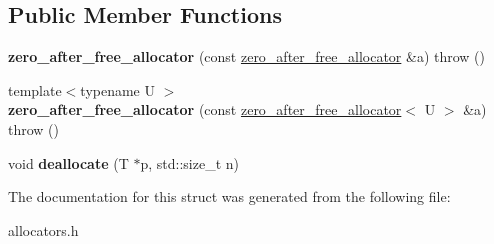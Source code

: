 \subsection*{Public Member Functions}
\begin{DoxyCompactItemize}
\item 
\mbox{\label{structzero__after__free__allocator_a2822b64128f40c3b54ed6dbbf258730b}} 
{\bfseries zero\+\_\+after\+\_\+free\+\_\+allocator} (const \mbox{\hyperlink{structzero__after__free__allocator}{zero\+\_\+after\+\_\+free\+\_\+allocator}} \&a)  throw ()
\item 
\mbox{\label{structzero__after__free__allocator_a9d83915e027c0be7b08d6e5e8e4424ba}} 
{\footnotesize template$<$typename U $>$ }\\{\bfseries zero\+\_\+after\+\_\+free\+\_\+allocator} (const \mbox{\hyperlink{structzero__after__free__allocator}{zero\+\_\+after\+\_\+free\+\_\+allocator}}$<$ U $>$ \&a)  throw ()
\item 
\mbox{\label{structzero__after__free__allocator_a63a1610931a9656c9373bf5dce2db796}} 
void {\bfseries deallocate} (T $\ast$p, std\+::size\+\_\+t n)
\end{DoxyCompactItemize}


The documentation for this struct was generated from the following file\+:\begin{DoxyCompactItemize}
\item 
allocators.\+h\end{DoxyCompactItemize}
